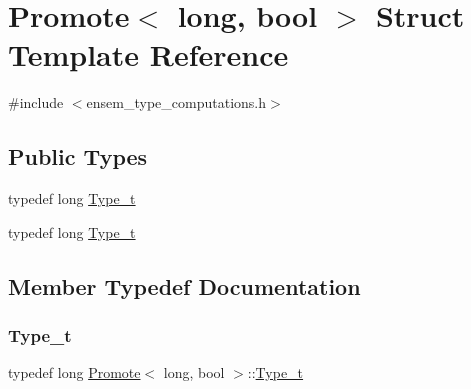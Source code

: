 \hypertarget{structPromote_3_01long_00_01bool_01_4}{}\section{Promote$<$ long, bool $>$ Struct Template Reference}
\label{structPromote_3_01long_00_01bool_01_4}


{\ttfamily \#include $<$ensem\+\_\+type\+\_\+computations.\+h$>$}

\subsection*{Public Types}
\begin{DoxyCompactItemize}
\item 
typedef long \mbox{\hyperlink{structPromote_3_01long_00_01bool_01_4_a925cd3195392464ce3df63fdd86c02bd}{Type\+\_\+t}}
\item 
typedef long \mbox{\hyperlink{structPromote_3_01long_00_01bool_01_4_a925cd3195392464ce3df63fdd86c02bd}{Type\+\_\+t}}
\end{DoxyCompactItemize}


\subsection{Member Typedef Documentation}
\mbox{\label{structPromote_3_01long_00_01bool_01_4_a925cd3195392464ce3df63fdd86c02bd}} 
\subsubsection{\texorpdfstring{Type\_t}{Type\_t}\hspace{0.1cm}{\footnotesize\ttfamily [1/2]}}
{\footnotesize\ttfamily typedef long \mbox{\hyperlink{structPromote}{Promote}}$<$ long, bool $>$\+::\mbox{\hyperlink{structPromote_3_01long_00_01bool_01_4_a925cd3195392464ce3df63fdd86c02bd}{Type\+\_\+t}}}

\mbox{\label{structPromote_3_01long_00_01bool_01_4_a925cd3195392464ce3df63fdd86c02bd}} 

